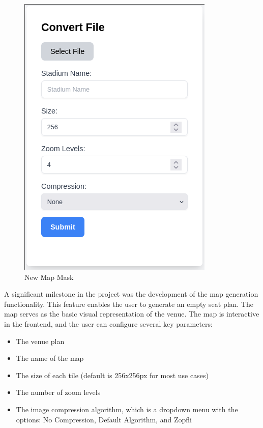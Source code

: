 
\begin{figure}
    \begin{center}
        \includegraphics[scale=0.5]{pics/new_map_mask.png}
        \caption{New Map Mask}
        \label{fig:impl:mapgen}
    \end{center}
\end{figure}

A significant milestone in the project was the development of the map generation functionality. This feature enables the user to generate an empty seat plan. The map serves as the basic visual representation of the venue. The map is interactive in the frontend, and the user can configure several key parameters:

\begin{itemize} 
    \item The venue plan 
    \item The name of the map 
    \item The size of each tile (default is 256x256px for most use cases) 
    \item The number of zoom levels 
    \item The image compression algorithm, which is a dropdown menu with the options: No Compression, Default Algorithm, and Zopfli \end{itemize}

